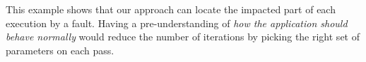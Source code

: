 This example shows that our approach can locate the impacted part of each execution by a fault. Having a pre-understanding of \textit{how the application should behave normally} would reduce the number of iterations by picking the right set of parameters on each pass. 






